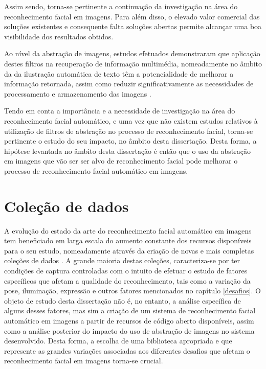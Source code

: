 Assim sendo, torna-se pertinente a continuação da investigação na área do reconhecimento facial em imagens. Para além disso, o elevado valor comercial das soluções existentes e consequente falta soluções abertas permite alcançar uma boa visibilidade dos resultados obtidos.

Ao nível da abstração de imagens, estudos efetuados demonstraram que aplicação destes filtros na recuperação de informação multimédia, nomeadamente no âmbito da da ilustração automática de texto têm a potencialidade de melhorar a informação retornada, assim como reduzir significativamente as necessidades de processamento e armazenamento das imagens \cite{Coelho:2012:IAC:2260641.2260676}. 

Tendo em conta a importância e a necessidade de investigação na área do reconhecimento facial automático, e uma vez que não existem estudos relativos à utilização de filtros de abstração no processo de reconhecimento facial, torna-se pertinente o estudo do seu impacto, no âmbito desta dissertação. Desta forma, a hipótese levantada no âmbito desta dissertação é então que o uso da abstração em imagens que vão ser ser alvo de reconhecimento facial pode melhorar o processo de reconhecimento facial automático em imagens.

\section{Coleção de dados} \label{sec:colecoes}

A evolução do estado da arte do reconhecimento facial automático em imagens tem beneficiado em larga escala do aumento constante dos recursos disponíveis para o seu estudo, nomeadamente através da criação de novas e mais completas coleções de dados \cite{Huang2007}. A grande maioria destas coleções, caracteriza-se por ter condições de captura controladas com o intuito de efetuar o estudo de fatores específicos que afetam a qualidade do reconhecimento, tais como a variação da pose, iluminação, expressão e outros fatores mencionados no capítulo \ref{desafios}. O objeto de estudo desta dissertação não é, no entanto, a análise específica de alguns desses fatores, mas sim a criação de um sistema de reconhecimento facial automático em imagens a partir de recursos de código aberto disponíveis, assim como a análise posterior do impacto do uso de abstração de imagens no sistema desenvolvido. Desta forma, a escolha de uma biblioteca apropriada e que represente as grandes variações associadas aos diferentes desafios que afetam o reconhecimento facial em imagens torna-se crucial.

